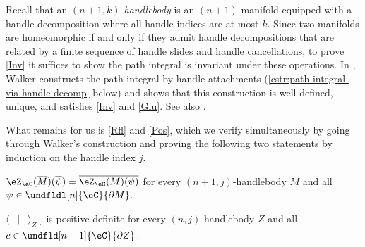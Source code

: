\documentclass[12pt,reqno]{amsart}
\newcommand{\C}{\eC}
\newcommand{\Z}{\eZ}
\newcommand{\fcj}[1]{\overline{#1}}
\newcommand{\orev}{\overline}
\newcommand{\bkt}[2]{\langle #1|#2 \rangle}
\newcommand{\defn}[1]{\emph{#1}}
\begin{document}
Recall that an \defn{$(n+1,k)$-handlebody} is an $(n+1)$-manifold equipped with a handle decomposition where all handle indices are at most $k$. Since two manifolds are homeomorphic if and only if they admit handle decompositions that are related by a finite sequence of handle slides and handle cancellations, to prove \ref{Inv} it suffices to show the path integral is invariant under these operations. In \cite{W06,W21}, Walker constructs the path integral by handle attachments (\cref{cstr:path-integral-via-handle-decomp} below) and shows that this construction is well-defined, unique, and satisfies \ref{Inv} and \ref{Glu}. See also \cite{Hai}.

What remains for us is \ref{Rfl} and \ref{Pos}, which we verify simultaneously by going through Walker's construction and proving the following two statements by induction on the handle index $j$.
\begin{lst} 
\item[($\mathrm{Rfl}_j$)] $\Z_\C(\orev{M})(\fcj\psi)=\overline{\Z_\C(M)(\psi)}$ for every $(n+1,j)$-handlebody $M$ and all $\psi\in\undfldl[n]{\C}{\partial M}$.

\item[($\mathrm{Pos}_j$)] $\bkt{-}{-}_{Z,c}$ is positive-definite for every $(n,j)$-handlebody $Z$ and all $c\in\undfld[n-1]{\C}{\partial Z}$.
\end{lst}
\end{document}

